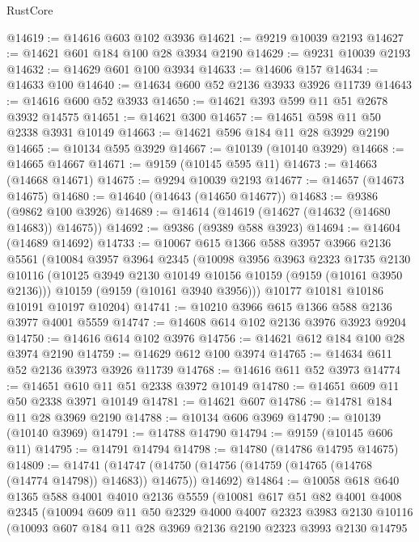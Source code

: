 \begin{lexlean}{RustCore}
\begin{coremodule}
@14619 := @14616 @603 @102 @3936
@14621 := @9219 @10039 @2193
@14627 := @14621 @601 @184 @100 @28 @3934 @2190
@14629 := @9231 @10039 @2193
@14632 := @14629 @601 @100 @3934
@14633 := @14606 @157
@14634 := @14633 @100
@14640 := @14634 @600 @52 @2136 @3933 @3926 @11739
@14643 := @14616 @600 @52 @3933
@14650 := @14621 @393 @599 @11 @51 @2678 @3932 @14575
@14651 := @14621 @300
@14657 := @14651 @598 @11 @50 @2338 @3931 @10149
@14663 := @14621 @596 @184 @11 @28 @3929 @2190
@14665 := @10134 @595 @3929
@14667 := @10139 (@10140 @3929)
@14668 := @14665 @14667
@14671 := @9159 (@10145 @595 @11)
@14673 := @14663 (@14668 @14671)
@14675 := @9294 @10039 @2193
@14677 := @14657 (@14673 @14675)
@14680 := @14640 (@14643 (@14650 @14677))
@14683 := @9386 (@9862 @100 @3926)
@14689 := @14614 (@14619 (@14627 (@14632 (@14680 @14683)) @14675))
@14692 := @9386 (@9389 @588 @3923)
@14694 := @14604 (@14689 @14692)
@14733 := @10067
    @615
    @1366
    @588
    @3957
    @3966
    @2136
    @5561
    (@10084
      @3957
      @3964
      @2345
      (@10098
        @3956
        @3963
        @2323
        @1735
        @2130
        @10116
        (@10125 @3949 @2130 @10149 @10156 @10159 (@9159 (@10161 @3950 @2136)))
        @10159
        (@9159 (@10161 @3940 @3956)))
      @10177
      @10181
      @10186
      @10191
      @10197
      @10204)
@14741 := @10210 @3966 @615 @1366 @588 @2136 @3977 @4001 @5559
@14747 := @14608 @614 @102 @2136 @3976 @3923 @9204
@14750 := @14616 @614 @102 @3976
@14756 := @14621 @612 @184 @100 @28 @3974 @2190
@14759 := @14629 @612 @100 @3974
@14765 := @14634 @611 @52 @2136 @3973 @3926 @11739
@14768 := @14616 @611 @52 @3973
@14774 := @14651 @610 @11 @51 @2338 @3972 @10149
@14780 := @14651 @609 @11 @50 @2338 @3971 @10149
@14781 := @14621 @607
@14786 := @14781 @184 @11 @28 @3969 @2190
@14788 := @10134 @606 @3969
@14790 := @10139 (@10140 @3969)
@14791 := @14788 @14790
@14794 := @9159 (@10145 @606 @11)
@14795 := @14791 @14794
@14798 := @14780 (@14786 @14795 @14675)
@14809 := @14741
    (@14747 (@14750 (@14756 (@14759 (@14765 (@14768 (@14774 @14798)) @14683)) @14675)) @14692)
@14864 := @10058
    @618
    @640
    @1365
    @588
    @4001
    @4010
    @2136
    @5559
    (@10081
      @617
      @51
      @82
      @4001
      @4008
      @2345
      (@10094
        @609
        @11
        @50
        @2329
        @4000
        @4007
        @2323
        @3983
        @2130
        @10116
        (@10093
          @607
          @184
          @11
          @28
          @3969
          @2136
          @2190
          @2323
          @3993
          @2130
          @14795

\end{coremodule}
\end{lexlean}
